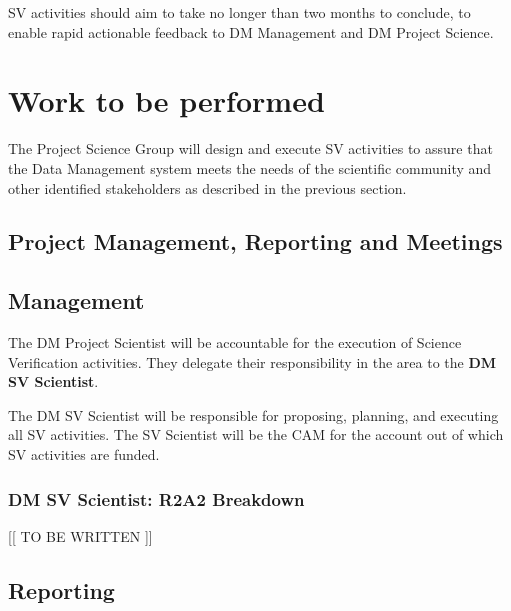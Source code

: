 SV activities should aim to take no longer than two months to conclude, to
enable rapid actionable feedback to DM Management and DM Project Science.

\section{Work to be performed} \label{sect:wps}

The Project Science Group will design and execute SV activities to assure
that the Data Management system meets the needs of the scientific community
and other identified stakeholders as described in the previous section.

%
%
%


\subsection{Project Management, Reporting and Meetings}

\subsection{Management}

The DM Project Scientist will be accountable for the execution of Science
Verification activities. They delegate their responsibility in the area to
the {\bf DM SV Scientist}.

The DM SV Scientist will be responsible for proposing, planning, and
executing all SV activities. The SV Scientist will be the CAM for the
account out of which SV activities are funded.

\subsubsection{DM SV Scientist: R2A2 Breakdown}

[[ TO BE WRITTEN ]]

\subsection{Reporting}

